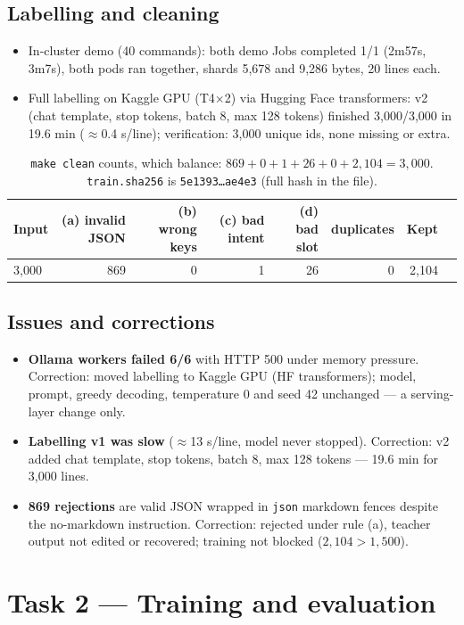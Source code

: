 \documentclass[11pt,a4paper]{article}
\begin{document}
\subsection*{Labelling and cleaning}
\begin{itemize}
\item In-cluster demo (40 commands): both demo Jobs completed 1/1 (2m57s, 3m7s), both pods ran together, shards 5,678 and 9,286 bytes, 20 lines each.
\item Full labelling on Kaggle GPU (T4$\times$2) via Hugging Face transformers: v2 (chat template, stop tokens, batch 8, max 128 tokens) finished 3,000/3,000 in 19.6 min ($\approx$0.4 s/line); verification: 3,000 unique ids, none missing or extra.
\end{itemize}
\begin{table}[h]\centering\small
\begin{tabular}{lrrrrrrr}
\toprule
Input & (a) invalid JSON & (b) wrong keys & (c) bad intent & (d) bad slot & duplicates & Kept \\
\midrule
3,000 & 869 & 0 & 1 & 26 & 0 & 2,104 \\
\bottomrule
\end{tabular}
\caption{\texttt{make clean} counts, which balance: $869+0+1+26+0+2{,}104=3{,}000$. \texttt{train.sha256} is \texttt{5e1393\ldots ae4e3} (full hash in the file).}
\end{table}
\subsection*{Issues and corrections}
\begin{itemize}
\item \textbf{Ollama workers failed 6/6} with HTTP 500 under memory pressure. Correction: moved labelling to Kaggle GPU (HF transformers); model, prompt, greedy decoding, temperature 0 and seed 42 unchanged --- a serving-layer change only.
\item \textbf{Labelling v1 was slow} ($\approx$13 s/line, model never stopped). Correction: v2 added chat template, stop tokens, batch 8, max 128 tokens --- 19.6 min for 3,000 lines.
\item \textbf{869 rejections} are valid JSON wrapped in \texttt{json} markdown fences despite the no-markdown instruction. Correction: rejected under rule (a), teacher output not edited or recovered; training not blocked ($2{,}104>1{,}500$).
\end{itemize}

\section{Task 2 --- Training and evaluation}
\end{document}
